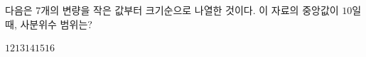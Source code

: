 다음은 7개의 변량을 작은 값부터 크기순으로 나열한 것이다. 이 자료의 중앙값이 $10$일 때, 사분위수 범위는?
\begin{choices32}{$12$}{$13$}{$14$}{$15$}{$16$}\end{choices32}
